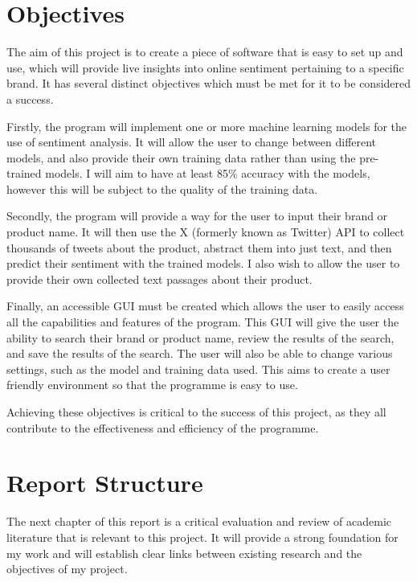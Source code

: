 \section{Objectives}
The aim of this project is to create a piece of software that is easy to set up and use, which will provide live insights into online sentiment pertaining to a specific brand. It has several distinct objectives which must be met for it to be considered a success.

Firstly, the program will implement one or more machine learning models for the use of sentiment analysis. It will allow the user to change between different models, and also provide their own training data rather than using the pre-trained models. I will aim to have at least 85\% accuracy with the models, however this will be subject to the quality of the training data.

Secondly, the program will provide a way for the user to input their brand or product name. It will then use the X (formerly known as Twitter) API to collect thousands of tweets about the product, abstract them into just text, and then predict their sentiment with the trained models. I also wish to allow the user to provide their own collected text passages about their product.

Finally, an accessible GUI must be created which allows the user to easily access all the capabilities and features of the program. This GUI will give the user the ability to search their brand or product name, review the results of the search, and save the results of the search. The user will also be able to change various settings, such as the model and training data used. This aims to create a user friendly environment so that the programme is easy to use.

Achieving these objectives is critical to the success of this project, as they all contribute to the effectiveness and efficiency of the programme.

\section{Report Structure}
The next chapter of this report is a critical evaluation and review of academic literature that is relevant to this project. It will provide a strong foundation for my work and will establish clear links between existing research and the objectives of my project.

